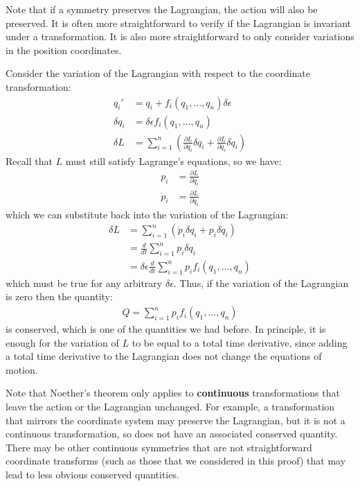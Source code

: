 Note that if a symmetry preserves the Lagrangian, the action will also be preserved. It is often more straightforward to verify if the Lagrangian is invariant under a transformation. It is also more straightforward to only consider variations in the position coordinates.

Consider the variation of the Lagrangian with respect to the coordinate transformation:
\begin{align}
q_i'&=q_i+f_i(q_1,\dots ,q_n)\delta\epsilon\nonumber\\
\delta q_i&=\delta\epsilon f_i(q_1,\dots ,q_n)\nonumber\\
\delta L&=\sum_{i=1}^n \left(\frac{\partial L}{\partial q_i}\delta q_i+\frac{\partial L}{\partial \dot{q}_i}\delta \dot{q}_i\right)
\end{align}
Recall that $L$ must still satisfy Lagrange's equations, so we have:
\begin{align}
p_i&=\frac{\partial L}{\partial \dot{q}_i}\nonumber\\
\dot{p}_i&=\frac{\partial L}{\partial q_i}
\end{align}
which we can substitute back into the variation of the Lagrangian:
\begin{align}
\delta L&=\sum_{i=1}^n \left(\dot{p}_i\delta q_i+p_i\delta \dot{q}_i\right)\nonumber\\
&=\frac{d}{dt}\sum_{i=1}^np_i\delta q_i\nonumber\\
&=\delta\epsilon \frac{d}{dt}\sum_{i=1}^np_if_i(q_1,\dots ,q_n)
\end{align}
which must be true for any arbitrary $\delta\epsilon$. Thus, if the variation of the Lagrangian is zero then the quantity:
\begin{align}
Q=\sum_{i=1}^np_if_i(q_1,\dots ,q_n)
\end{align}
is conserved, which is one of the quantities we had before. In principle, it is enough for the variation of $L$ to be equal to a total time derivative, since adding a total time derivative to the Lagrangian does not change the equations of motion.

Note that Noether's theorem only applies to \textbf{continuous} transformations that leave the action or the Lagrangian unchanged. For example, a transformation that mirrors the coordinate system may preserve the Lagrangian, but it is not a continuous transformation, so does not have an associated conserved quantity. There may be other continuous symmetries that are not straightforward coordinate transforms (such as those that we considered in this proof) that may lead to less obvious conserved quantities. 

